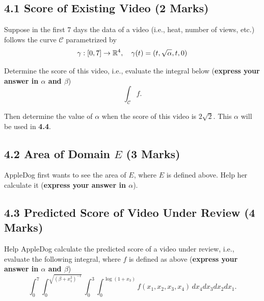 \documentclass[12pt]{article}
\renewcommand{\emph}[1]{{\color{Turquoise3}\textsl{#1}}}
\begin{document}
\subsection*{4.1 Score of Existing Video (2 Marks)} 
\par Suppose in the first 7 days the data of a video (i.e., heat, number of views, etc.) follows the curve $\mathcal{C}$ parametrized by 
\begin{equation*}
    \gamma:[0,7]\to \mathbb{R}^4,\quad \gamma(t) = (t, \sqrt{\alpha}, t, 0)
\end{equation*}

\par Determine the score of this video, i.e., evaluate the integral below (\textbf{express your answer in $\alpha$ and $\beta$}) 
\begin{equation*}
    \int_{\mathcal{C}}f. 
\end{equation*}

\par Then determine the value of $\alpha$ when the score of this video is $2\sqrt{2}$. This \emph{$\alpha$} will be used in \textbf{4.4}. 

\subsection*{4.2 Area of Domain $E$ (3 Marks)} 
AppleDog first wants to see the area of $E$, where $E$ is defined above. Help her calculate it (\textbf{express your answer in $\alpha$}).  

\subsection*{4.3 Predicted Score of Video Under Review (4 Marks)}
Help AppleDog calculate the predicted score of a video under review, i.e., evaluate the following integral, where $f$ is defined as above (\textbf{express your answer in $\alpha$ and $\beta$}) 
\begin{equation*}
	    \int_0^7 \int_0^{\sqrt{(\beta + x_1^2)^{-1}}} \int_0^{3} \int_0^{\log(1 + x_3)} f(x_1, x_2, x_3, x_4)\,dx_4 dx_3 dx_2 dx_1.
\end{equation*}
\end{document}
